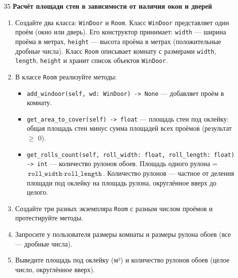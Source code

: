 \begin{enumerate}
\item[35] \textbf{Расчёт площади стен в зависимости от наличия окон и дверей}
\begin{enumerate}
    \item Создайте два класса: \texttt{WinDoor} и \texttt{Room}.  
    Класс \texttt{WinDoor} представляет один проём (окно или дверь). Его конструктор принимает:  
    \texttt{width} — ширина проёма в метрах,  
    \texttt{height} — высота проёма в метрах (положительные дробные числа).  
    Класс \texttt{Room} описывает комнату с размерами \texttt{width}, \texttt{length}, \texttt{height} и хранит список объектов \texttt{WinDoor}.

    \item В классе \texttt{Room} реализуйте методы:  
    \begin{itemize}
        \item \texttt{add\_windoor(self, wd: WinDoor) -> None} — добавляет проём в комнату.
        \item \texttt{get\_area\_to\_cover(self) -> float} — площадь стен под оклейку: общая площадь стен минус сумма площадей всех проёмов (результат $\geqslant$ 0).
        \item \texttt{get\_rolls\_count(self, roll\_width: float, roll\_length: float) -> int} — количество рулонов обоев. Площадь одного рулона = \(\texttt{roll\_width} \cdot \texttt{roll\_length}\). Количество рулонов — частное от деления площади под оклейку на площадь рулона, округлённое вверх до целого.
    \end{itemize}

    \item Создайте три разных экземпляра \texttt{Room} с разным числом проёмов и протестируйте методы.

    \item Запросите у пользователя размеры комнаты и размеры рулона обоев (все — дробные числа).

    \item Выведите площадь под оклейку (м²) и количество рулонов обоев (целое число, округлённое вверх).
\end{enumerate}
\end{enumerate}